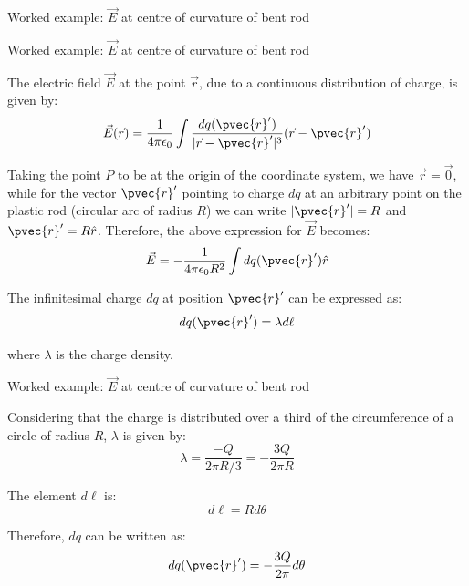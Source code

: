 {\begin{frame}{Worked example: $\vec{E}$ at centre of curvature of bent rod}
\end{frame}

%
%
%

\begin{frame}{Worked example: $\vec{E}$ at centre of curvature of bent rod}

The electric field $\vec{E}$ at the point $\vec{r}$, due to a continuous
distribution of charge, is given by:
\begin{equation*}
  \vec{E}(\vec{r}) = \frac{1}{4\pi\epsilon_0}
   \int \frac{dq(\pvec{r}')}{|\vec{r}-\pvec{r}'|^3} (\vec{r}-\pvec{r}')
\end{equation*}

Taking the point $P$ to be at the origin of the coordinate system,
we have $\vec{r}=\vec{0}$,
while for the vector $\pvec{r}'$ pointing to charge $dq$
at an arbitrary point on the plastic rod (circular arc of radius $R$)
we can write $|\pvec{r}'|=R$ and $\pvec{r}'=R\hat{r}$.
Therefore, the above expression for $\vec{E}$ becomes:
\begin{equation*}
  \vec{E} = - \frac{1}{4\pi\epsilon_0 R^2}
   \int dq(\pvec{r}') \hat{r}
\end{equation*}

The infinitesimal charge $dq$ at position $\pvec{r}'$ can be expressed as:
\begin{equation*}
   dq(\pvec{r}') = \lambda d\ell
\end{equation*}

where $\lambda$ is the charge density.

\end{frame}

%
%
%

\begin{frame}{Worked example: $\vec{E}$ at centre of curvature of bent rod}

Considering that the charge is distributed
over a third of the circumference of a circle of radius $R$,
$\lambda$ is given by:
\begin{equation*}
   \lambda = \frac{-Q}{2\pi R/3} = -\frac{3Q}{2\pi R}
\end{equation*}

The element $d\ell$ is:
\begin{equation*}
   d\ell = R d\theta
\end{equation*}

Therefore, $dq$ can be written as:
\begin{equation*}
   dq(\pvec{r}') = -\frac{3Q}{2\pi} d\theta
\end{equation*}


\end{frame}}
